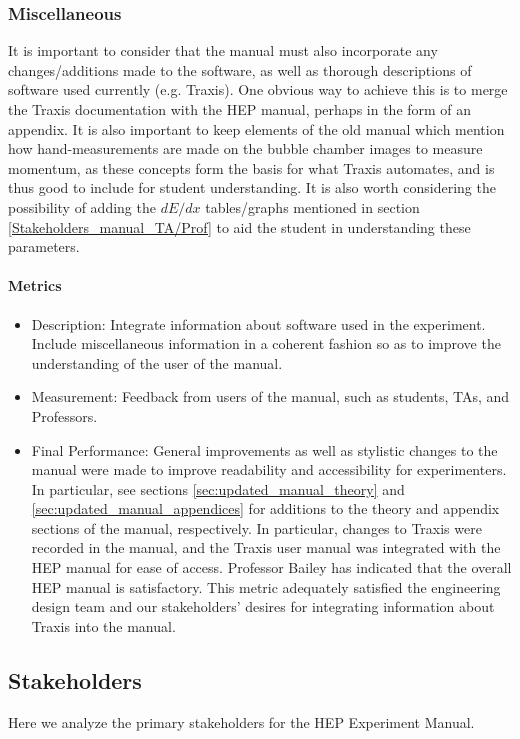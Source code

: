 \documentclass[12pt]{article} %
\begin{document}
\subsubsection{Miscellaneous}
It is important to consider that the manual must also incorporate any changes/additions made to the software, as well as thorough descriptions of software used currently (e.g. Traxis). One obvious way to achieve this is to merge the Traxis documentation with the HEP manual, perhaps in the form of an appendix. It is also important to keep elements of the old manual which mention how hand-measurements are made on the bubble chamber images to measure momentum, as these concepts form the basis for what Traxis automates, and is thus good to include for student understanding. It is also worth considering the possibility of adding the $dE/dx$ tables/graphs mentioned in section \ref{Stakeholders_manual_TA/Prof} to aid the student in understanding these parameters. 

\paragraph{Metrics}
\begin{itemize}
    \item Description: Integrate information about software used in the experiment. Include miscellaneous information in a coherent fashion so as to improve the understanding of the user of the manual.
    \item Measurement: Feedback from users of the manual, such as students, TAs, and Professors.
    \item Final Performance: General improvements as well as stylistic changes to the manual were made to improve readability and accessibility for experimenters. In particular, see sections \ref{sec:updated_manual_theory} and \ref{sec:updated_manual_appendices} for additions to the theory and appendix sections of the manual, respectively. In particular, changes to Traxis were recorded in the manual, and the Traxis user manual was integrated with the HEP manual for ease of access. Professor Bailey has indicated that the overall HEP manual is satisfactory. This metric adequately satisfied the engineering design team and our stakeholders’ desires for integrating information about Traxis into the manual.
\end{itemize}

\subsection{Stakeholders}
Here we analyze the primary stakeholders for the HEP Experiment Manual.
\end{document}
